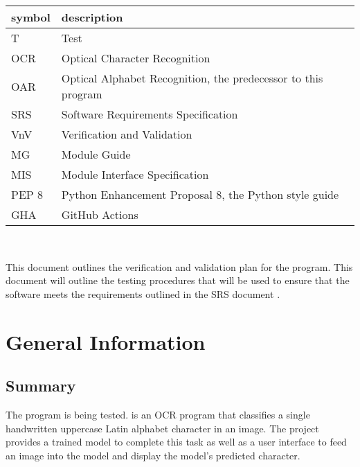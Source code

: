 \documentclass[12pt, titlepage]{article}
\begin{document}
\renewcommand{\arraystretch}{1.2}
\begin{tabular}{l l} 
  \toprule		
  \textbf{symbol} & \textbf{description}\\
  \midrule 
  T & Test\\
  OCR & Optical Character Recognition\\
  OAR & Optical Alphabet Recognition, the predecessor to this program\\
  SRS & Software Requirements Specification\\
  VnV & Verification and Validation\\
  MG & Module Guide\\
  MIS & Module Interface Specification\\
  PEP 8 & Python Enhancement Proposal 8, the Python style guide\\
  GHA & GitHub Actions\\
  \bottomrule
\end{tabular}\\



\newpage


This document outlines the verification and validation plan for the \progname{}
program. This document will outline the testing procedures that will be used to
ensure that the software meets the requirements outlined in the SRS document \citep{SRS}.

\section{General Information}

\subsection{Summary}

The \progname{} program is being tested. \progname{} is an OCR program that classifies
a single handwritten uppercase Latin alphabet character in an image. The project
provides a trained model to complete this task as well as a user interface to
feed an image into the model and display the model's predicted character.

\end{document}
